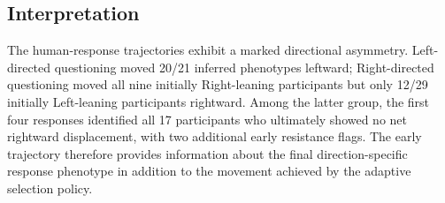 
\subsection{Interpretation}
The human-response trajectories exhibit a marked directional
asymmetry. Left-directed questioning moved 20/21 inferred
phenotypes leftward; Right-directed questioning moved all
nine initially Right-leaning participants but only 12/29
initially Left-leaning participants rightward. Among the latter
group, the first four responses identified all 17 participants
who ultimately showed no net rightward displacement, with two
additional early resistance flags. The early trajectory therefore
provides information about the final direction-specific response
phenotype in addition to the movement achieved by the adaptive
selection policy.
